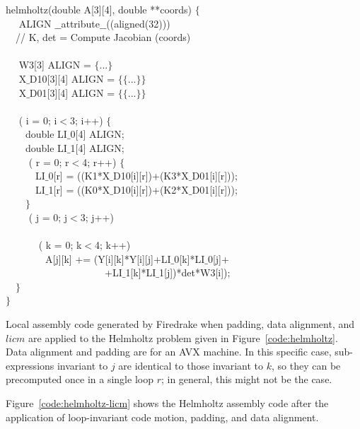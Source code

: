 \documentclass[conference]{IEEEtran}
\begin{document}
\begin{algorithm}[t]
\small
{} helmholtz(double A[3][4], double **coords) $\lbrace$\\
~~ ALIGN $\_\_$attribute$\_\_$((aligned(32))) \\
~~// K, det = Compute Jacobian (coords) \\
~~\\
~~ W3[3] ALIGN = $\lbrace$...$\rbrace$\\
~~ X$\_$D10[3][4] ALIGN = $\lbrace\lbrace$...$\rbrace\rbrace$\\
~~ X$\_$D01[3][4] ALIGN = $\lbrace\lbrace$...$\rbrace\rbrace$\\
~~\\
~~ ( i = 0; i$<$3; i++) $\lbrace$ \\
~~~~double LI$\_$0[4] ALIGN;\\
~~~~double LI$\_$1[4] ALIGN;\\
~~~~ ( r = 0; r$<$4; r++) $\lbrace$ \\
~~~~~~LI$\_$0[r] = ((K1*X$\_$D10[i][r])+(K3*X$\_$D01[i][r]));\\
~~~~~~LI$\_$1[r] = ((K0*X$\_$D10[i][r])+(K2*X$\_$D01[i][r]));\\
~~~~$\rbrace$\\
~~~~ ( j = 0; j$<$3; j++) \\
~~~~~~\\
~~~~~~ ( k = 0; k$<$4; k++) \\
~~~~~~~~A[j][k] += (Y[i][k]*Y[i][j]+LI$\_$0[k]*LI$\_$0[j]+\\
~~~~~~~~~~~~~~~~~~~~+LI$\_$1[k]*LI$\_$1[j])*det*W3[i]);\\
~~$\rbrace$\\
$\rbrace$
\caption{Local assembly code generated by Firedrake when padding, data alignment, and $licm$ are applied to the Helmholtz problem given in Figure~\ref{code:helmholtz}. Data alignment and padding are for an AVX machine. In this specific case, sub-expressions invariant to $j$ are identical to those invariant to $k$, so they can be precomputed once in a single loop $r$; in general, this might not be the case.}
\label{code:helmholtz-licm}
\end{algorithm}

Figure~\ref{code:helmholtz-licm} shows the Helmholtz assembly code after the application of loop-invariant code motion, padding, and data alignment.
\end{document}
